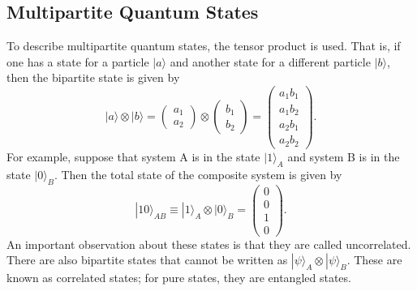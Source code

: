 \documentclass[a4paper]{article}
\begin{document}
\subsection{Multipartite Quantum States}
To describe multipartite quantum states, the tensor product is used. That is, if one has a state for a particle $|a\rangle$ and another state for a different particle $|b\rangle$, then the bipartite state is given by
\begin{equation}
|a\rangle \otimes |b\rangle=
	\begin{pmatrix}
		a_1 \\
		a_2
	\end{pmatrix}\otimes
	\begin{pmatrix}
		b_1 \\
		b_2
	\end{pmatrix}=
	\begin{pmatrix}
		a_1 b_1 \\
		a_1 b_2 \\
		a_2 b_1 \\
		a_2 b_2
	\end{pmatrix}.
\end{equation}
For example, suppose that system A is in the state $|1\rangle_A$ and system B is in the state $|0\rangle_B$. Then the total state of the composite system is given by
\begin{equation}
|10\rangle_{AB}\equiv |1\rangle_A\otimes |0\rangle_B=
	\begin{pmatrix}
		0 \\
		0\\
		1\\
		0
	\end{pmatrix}.
\end{equation}
An important observation about these states is that they are called uncorrelated. There are also bipartite states that cannot be written as $|\psi\rangle_A\otimes|\psi\rangle_B$. These are known as correlated states; for pure states, they are entangled states.\\
\end{document}
